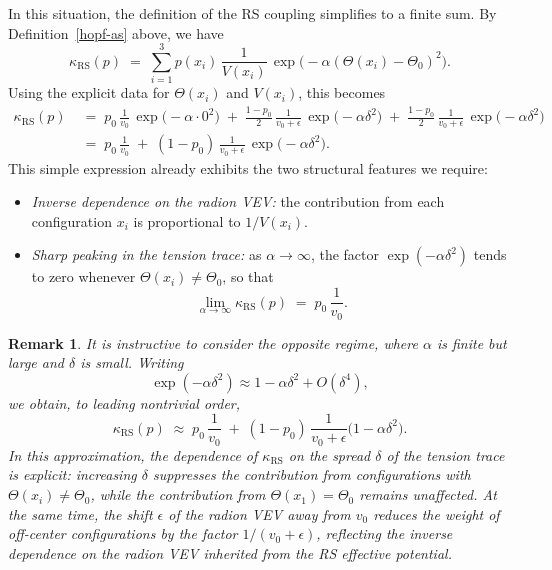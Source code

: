 \documentclass{article}
\newtheorem{rk}{Remark}
\numberwithin{tm}{section}
\numberwithin{dn}{section}
\numberwithin{as}{section}
\numberwithin{rk}{section}
\numberwithin{lem}{section}
\numberwithin{ax}{section}
\numberwithin{pp}{section}
\numberwithin{eg}{section}
\numberwithin{war}{section}
\numberwithin{equation}{section}
\numberwithin{prop}{section}
\numberwithin{nt}{section}
\numberwithin{rc}{section}
\numberwithin{setup}{section}
\begin{document}
	In this situation, the definition of the RS coupling simplifies to a finite sum. By Definition~\ref{hopf-as} above, we have
	\begin{equation}
		\kappa_{\mathrm{RS}}(p)
		\;=\;
		\sum_{i=1}^3 p(x_i)\, \frac{1}{V(x_i)} \,
		\exp\!\bigl(-\alpha (\Theta(x_i) - \Theta_0)^2\bigr).
	\end{equation}
	Using the explicit data for $\Theta(x_i)$ and $V(x_i)$, this becomes
	\begin{align}
		\kappa_{\mathrm{RS}}(p)
		\;&=\;
		p_0 \, \frac{1}{v_0} \, \exp\!\bigl(-\alpha \cdot 0^2\bigr)
		\;+\;
		\frac{1 - p_0}{2} \, \frac{1}{v_0 + \epsilon} \,
		\exp\!\bigl(-\alpha \delta^2\bigr)
		\;+\;
		\frac{1 - p_0}{2} \, \frac{1}{v_0 + \epsilon} \,
		\exp\!\bigl(-\alpha \delta^2\bigr)
		\\
		&=\;
		p_0 \, \frac{1}{v_0}
		\;+\;
		(1 - p_0) \, \frac{1}{v_0 + \epsilon} \,
		\exp\!\bigl(-\alpha \delta^2\bigr).
	\end{align}
	This simple expression already exhibits the two structural features we require:
	\begin{itemize}
		\item \emph{Inverse dependence on the radion VEV:} the contribution from each configuration $x_i$ is proportional to $1/V(x_i)$.
		\item \emph{Sharp peaking in the tension trace:} as $\alpha \to \infty$, the factor $\exp(-\alpha \delta^2)$ tends to zero whenever $\Theta(x_i) \neq \Theta_0$, so that
		\[
		\lim_{\alpha \to \infty} \kappa_{\mathrm{RS}}(p)
		\;=\;
		p_0 \, \frac{1}{v_0}.
		\]
	\end{itemize}
	
	\begin{rk}
		It is instructive to consider the opposite regime, where $\alpha$ is finite but large and $\delta$ is small. Writing
		\[
		\exp(-\alpha \delta^2) \approx 1 - \alpha \delta^2 + O(\delta^4),
		\]
		we obtain, to leading nontrivial order,
		\begin{equation}
			\kappa_{\mathrm{RS}}(p)
			\;\approx\;
			p_0 \, \frac{1}{v_0}
			\;+\;
			(1 - p_0) \, \frac{1}{v_0 + \epsilon}
			\bigl(1 - \alpha \delta^2\bigr).
		\end{equation}
		In this approximation, the dependence of $\kappa_{\mathrm{RS}}$ on the spread $\delta$ of the tension trace is explicit: increasing $\delta$ suppresses the contribution from configurations with $\Theta(x_i) \neq \Theta_0$, while the contribution from $\Theta(x_1) = \Theta_0$ remains unaffected. At the same time, the shift $\epsilon$ of the radion VEV away from $v_0$ reduces the weight of off-center configurations by the factor $1/(v_0 + \epsilon)$, reflecting the inverse dependence on the radion VEV inherited from the RS effective potential.
	\end{rk}
	
\end{document}
